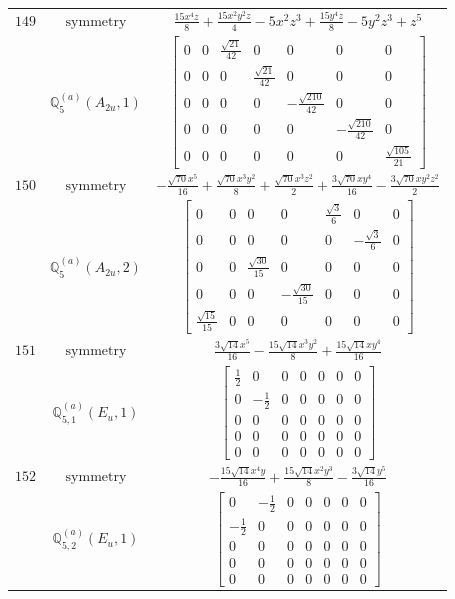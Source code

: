 \documentclass[fleqn,8pt,landscape]{jsarticle}
\begin{document}
\begin{longtable}{ccc}
$ 149 $ & $ \text{symmetry} $ & $ \frac{15 x^{4} z}{8} + \frac{15 x^{2} y^{2} z}{4} - 5 x^{2} z^{3} + \frac{15 y^{4} z}{8} - 5 y^{2} z^{3} + z^{5} $ \\
$  $ & $ \mathbb{Q}_{5}^{(a)}(A_{2u},1) $ & $ \begin{bmatrix} 0 & 0 & \frac{\sqrt{21}}{42} & 0 & 0 & 0 & 0 \\ 0 & 0 & 0 & \frac{\sqrt{21}}{42} & 0 & 0 & 0 \\ 0 & 0 & 0 & 0 & - \frac{\sqrt{210}}{42} & 0 & 0 \\ 0 & 0 & 0 & 0 & 0 & - \frac{\sqrt{210}}{42} & 0 \\ 0 & 0 & 0 & 0 & 0 & 0 & \frac{\sqrt{105}}{21} \end{bmatrix} $ \\ \hline
$ 150 $ & $ \text{symmetry} $ & $ - \frac{\sqrt{70} x^{5}}{16} + \frac{\sqrt{70} x^{3} y^{2}}{8} + \frac{\sqrt{70} x^{3} z^{2}}{2} + \frac{3 \sqrt{70} x y^{4}}{16} - \frac{3 \sqrt{70} x y^{2} z^{2}}{2} $ \\
$  $ & $ \mathbb{Q}_{5}^{(a)}(A_{2u},2) $ & $ \begin{bmatrix} 0 & 0 & 0 & 0 & \frac{\sqrt{3}}{6} & 0 & 0 \\ 0 & 0 & 0 & 0 & 0 & - \frac{\sqrt{3}}{6} & 0 \\ 0 & 0 & \frac{\sqrt{30}}{15} & 0 & 0 & 0 & 0 \\ 0 & 0 & 0 & - \frac{\sqrt{30}}{15} & 0 & 0 & 0 \\ \frac{\sqrt{15}}{15} & 0 & 0 & 0 & 0 & 0 & 0 \end{bmatrix} $ \\ \hline
$ 151 $ & $ \text{symmetry} $ & $ \frac{3 \sqrt{14} x^{5}}{16} - \frac{15 \sqrt{14} x^{3} y^{2}}{8} + \frac{15 \sqrt{14} x y^{4}}{16} $ \\
$  $ & $ \mathbb{Q}_{5,1}^{(a)}(E_{u},1) $ & $ \begin{bmatrix} \frac{1}{2} & 0 & 0 & 0 & 0 & 0 & 0 \\ 0 & - \frac{1}{2} & 0 & 0 & 0 & 0 & 0 \\ 0 & 0 & 0 & 0 & 0 & 0 & 0 \\ 0 & 0 & 0 & 0 & 0 & 0 & 0 \\ 0 & 0 & 0 & 0 & 0 & 0 & 0 \end{bmatrix} $ \\ \hline
$ 152 $ & $ \text{symmetry} $ & $ - \frac{15 \sqrt{14} x^{4} y}{16} + \frac{15 \sqrt{14} x^{2} y^{3}}{8} - \frac{3 \sqrt{14} y^{5}}{16} $ \\
$  $ & $ \mathbb{Q}_{5,2}^{(a)}(E_{u},1) $ & $ \begin{bmatrix} 0 & - \frac{1}{2} & 0 & 0 & 0 & 0 & 0 \\ - \frac{1}{2} & 0 & 0 & 0 & 0 & 0 & 0 \\ 0 & 0 & 0 & 0 & 0 & 0 & 0 \\ 0 & 0 & 0 & 0 & 0 & 0 & 0 \\ 0 & 0 & 0 & 0 & 0 & 0 & 0 \end{bmatrix} $ \\ \hline

\end{longtable}
\end{document}
